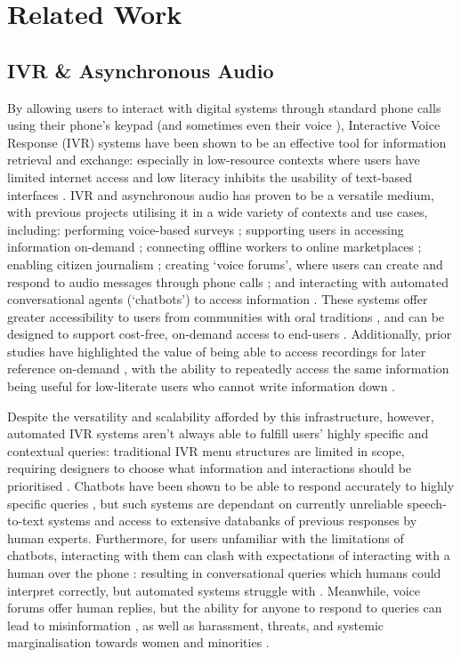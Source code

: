 \section{Related Work}

\subsection{IVR \& Asynchronous Audio}

By allowing users to interact with digital systems through standard phone calls using their phone's keypad (and sometimes even their voice \cite{khullar2021}), Interactive Voice Response (IVR) systems have been shown to be an effective tool for information retrieval and exchange: especially in low-resource contexts where users have limited internet access \cite{eitzinger2019} and low literacy inhibits the usability of text-based interfaces \cite{sharma2009}. IVR and asynchronous audio has proven to be a versatile medium, with previous projects utilising it in a wide variety of contexts and use cases, including: performing voice-based surveys \cite{khullar2021_surveys}; supporting users in accessing information on-demand \cite{Riaz2017}; connecting offline workers to online marketplaces \cite{Richardson2022}; enabling citizen journalism \cite{Ejaz2018}; creating `voice forums', where users can create and respond to audio messages through phone calls \cite{Patel2010, Vashistha2015}; and interacting with automated conversational agents (`chatbots') to access information \cite{Jain2018, Yadav2019}. These systems offer greater accessibility to users from communities with oral traditions \cite{Ndwe2012}, and can be designed to support cost-free, on-demand access to end-users \cite{Richardson2022}. Additionally, prior studies have highlighted the value of being able to access recordings for later reference on-demand \cite{Talhouk2017}, with the ability to repeatedly access the same information being useful for low-literate users who cannot write information down \cite{Jain2018}. 

Despite the versatility and scalability afforded by this infrastructure, however, automated IVR systems aren't always able to fulfill users' highly specific and contextual queries: traditional IVR menu structures are limited in scope, requiring designers to choose what information and interactions should be prioritised \cite{Richardson2022}. Chatbots have been shown to be able to respond accurately to highly specific queries \cite{Jain2018}, but such systems are dependant on currently unreliable speech-to-text systems and access to extensive databanks of previous responses by human experts. Furthermore, for users unfamiliar with the limitations of chatbots, interacting with them can clash with expectations of interacting with a human over the phone \cite{Jain2018}: resulting in conversational queries which humans could interpret correctly, but automated systems struggle with \cite{Yadav2019}. Meanwhile, voice forums offer human replies, but the ability for anyone to respond to queries can lead to misinformation \cite{Patel2010}, as well as harassment, threats, and systemic marginalisation towards women and minorities \cite{Vashistha2019}.

